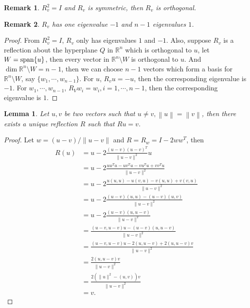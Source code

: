 \documentclass[11pt]{book}
\newtheorem{lemma}[theorem]{Lemma}
\newtheorem{remark}{Remark}[chapter]
\theoremstyle{definition}
\numberwithin{equation}{chapter}
\begin{document}
\begin{subappendices}
\begin{remark}
$R_v^2 = I$ and $R_v$ is symmetric, then $R_v$ is orthogonal.
\end{remark}

\begin{remark}\label{eigenvalue_of_reflection}
$R_v$ has one eigenvalue $-1$ and $n-1$ eigenvalues $1$.
\end{remark}
\begin{proof}
From $R_v^2 = I$, $R_v$ only has eigenvalues $1$ and $-1$. Also, suppose $R_v$ is a reflection about the hyperplane $Q$ in $\mathbb{R}^n$ which is orthogonal to $u$, let $W = {\rm  span}\{u\}$, then every vector in $\mathbb{R}^n\setminus W$ is orthogonal to $u$. And $\dim \mathbb{R}^n\setminus W = n - 1$, then we can choose $n - 1$ vectors which form a basis for $\mathbb{R}^n\setminus W$, say $\{w_1, \cdots, w_{n-1}\}$. For $u$, $R_v u = - u$, then the corresponding eigenvalue is $-1$. For $w_1, \cdots, w_{n-1}$, $R_V w_i = w_i, i = 1, \cdots, n-1$, then the corresponding eigenvalue is $1$.
\end{proof}

\medskip

\begin{lemma}{\rm \cite{35}}
Let $u, v$ be two vectors such that $u \neq v, \left\|u\right\| = \left\|v\right\|$, then there exists a unique reflection $R$ such that $Ru = v$.
\end{lemma}
\begin{proof}
Let $w = (u-v) /\|u-v\|$ and $R = R_w = I - 2 ww^T$, then
\begin{align*}
    R(u) & = u - 2 \frac{(u-v)(u-v)^T}{\|u-v\|^2}u \\
    & = u - 2 \frac{uu^Tu - uv^Tu - vu^Tu + vv^Tu}{\|u-v\|^2} \\
    & = u - 2 \frac{u(u,u) - u(v,u) - v(u,u) + v(v,u)}{\|u-v\|^2} \\
    & = u - 2 \frac{(u-v)(u,u) - (u-v)(u,v)}{\|u-v\|^2} \\
    & = u - 2 \frac{(u-v)(u,u-v)}{\|u-v\|^2} \\
    & = \frac{(u-v,u-v)u - (u-v)(u,u-v)}{\|u-v\|^2} \\
    & = \frac{(u-v,u-v)u - 2(u,u-v) + 2(u,u-v)v}{\|u-v\|^2} \\
    & = \frac{2(u,u-v)v}{\|u-v\|^2} \\
    & = \frac{2(\|u\|^2 - (u,v))v}{\|u-v\|^2} \\
    & = v.
\end{align*}


\end{proof}
\end{subappendices}
\end{document}
